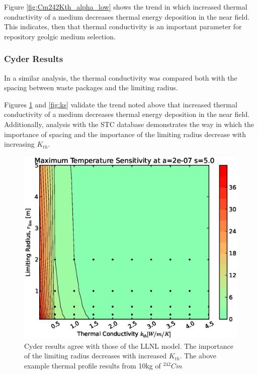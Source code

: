 Figure \ref{fig:Cm242Kth_alpha_low} shows the trend in which increased thermal conductivity of a medium decreases thermal energy 
deposition in the near field. This indicates, then that thermal conductivity is 
an important parameter for repository geolgic medium selection. 

\subsubsection{Cyder Results}

In a similar analysis, the thermal conductivity was compared both with the 
spacing between waste packages and the limiting radius. 

Figures \ref{fig:kr} and \ref{fig:ks} validate the trend noted above that 
increased thermal conductivity of a medium decreases thermal energy deposition 
in the near field.  Additionally, analysis with the \Cyder STC database 
demonstrates the way in which the importance of spacing and the importance of 
the limiting radius decrease with increasing $K_{th}$.

\begin{figure}[htbp!]
\begin{center}
\includegraphics[width=\columnwidth]{./thermal_demonstration/conductivity/kr.eps}
\end{center}
\caption[$K_{th}$ vs. $r_{lim}$ Sensitivity in Cyder]
{Cyder results agree with 
those of the LLNL model. The importance of the limiting radius decreases with 
increased $K_{th}$. The above example thermal profile results from 10kg of 
$^{242}Cm$}
\label{fig:kr}
\end{figure}


